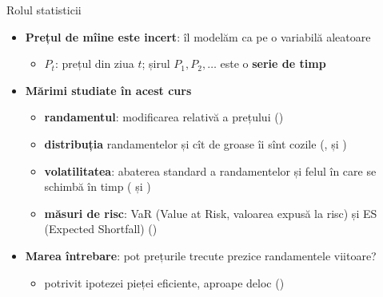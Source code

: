\begin{frame}{Rolul statisticii}
\itemsize{\small}
\begin{itemize}
    \item \textbf{Prețul de mîine este incert}: îl modelăm ca pe o variabilă aleatoare
    \begin{itemize}
        \item $P_t$: prețul din ziua $t$; șirul $P_1, P_2, \ldots$ este o \textbf{serie de timp}
    \end{itemize}
    \item \textbf{Mărimi studiate în acest curs}
    \begin{itemize}
        \item \textbf{randamentul}: modificarea relativă a prețului ()
        \item \textbf{distribuția} randamentelor și cît de groase îi sînt cozile (,  și )
        \item \textbf{volatilitatea}: abaterea standard a randamentelor și felul în care se schimbă în timp ( și )
        \item \textbf{măsuri de risc}: VaR (Value at Risk, valoarea expusă la risc) și ES (Expected Shortfall) ()
    \end{itemize}
    \item \textbf{Marea întrebare}: pot prețurile trecute prezice randamentele viitoare?
    \begin{itemize}
        \item potrivit ipotezei pieței eficiente, aproape deloc ()
    \end{itemize}
\end{itemize}
\end{frame}

